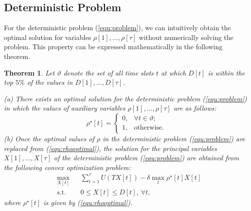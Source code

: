 \documentclass[10pt,journal,compsoc]{IEEEtran}
\newtheorem{theorem}{Theorem}
\begin{document}
\subsection{Deterministic Problem}\label{subsec:deterministicproblem}
For the deterministic problem (\ref{equ:problem}),
we can intuitively obtain the optimal solution for  variables $\rho[1], \ldots, \rho[\tau]$ without numerically solving the problem. This property can be expressed mathematically in the following theorem.





\vspace{0.1cm}
\begin{theorem} \label{theorem2}
Let $\vartheta$ denote the set of all time slots $t$ at which $D[t]$ is within the top $5\%$ of the values in $D[1],\ldots,D[\tau]$.

\vspace{0.2cm}

(a) There exists an optimal solution for  the deterministic problem (\ref{equ:problem}) in which the values of auxiliary variables $\rho[1], \ldots, \rho[\tau]$  are as follows:
\begin{equation}\label{equ:rhooptimal}
\rho^{\star}[t]=
\begin{cases}
0, &\forall  t \in \vartheta;\\
1, & \text{otherwise}.
\end{cases}
\end{equation}
(b) Once  the optimal values of $\rho$  in the deterministic problem (\ref{equ:problem}) are replaced from  (\ref{equ:rhooptimal}), the solution for the principal variables $X[1], \ldots, X[\tau]$ of  the deterministic problem (\ref{equ:problem}) are obtained from the following convex optimization problem:
\begin{equation}\label{equ:deter}
\begin{aligned}
& \underset{X[t]}{\text{max}} & &\sum_{t=1}^{\tau} U(TX[t])-\delta \max_t \rho^{\star}[t] X[t] \\
& \text{s.t.} & &0 \leq X[t] \leq D[t],   \ \forall  t,
\end{aligned}
\end{equation}
where $\rho^{\star}[t]$ is given by (\ref{equ:rhooptimal}).
\end{theorem}
\end{document}

